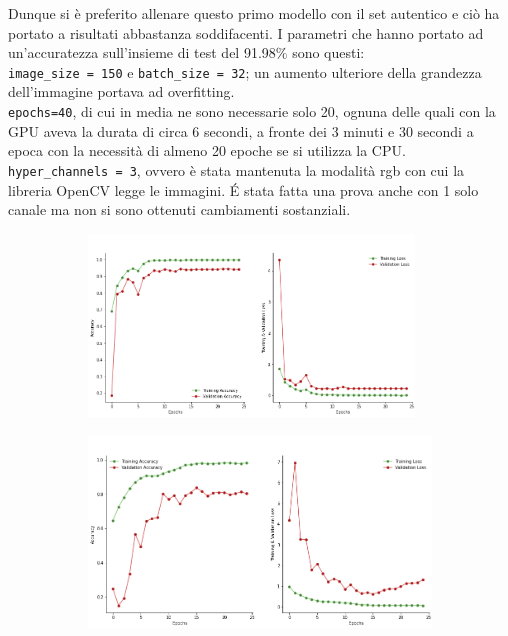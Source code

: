 \begin{enumerate}
       Dunque si è preferito allenare questo primo modello con il set autentico e 
       ciò ha portato a risultati abbastanza soddifacenti. 
       I parametri che hanno portato ad un'accuratezza sull'insieme di test del 91.98$\%$ sono questi:\\
       \lstinline{image_size = 150} e \lstinline{batch_size = 32}; un aumento ulteriore
        della grandezza dell'immagine portava ad overfitting. \\
       \lstinline{epochs=40}, di cui in media ne sono necessarie solo 20, ognuna delle quali con la GPU aveva la durata di circa 6 secondi, 
       a fronte dei 3 minuti e 30 secondi a epoca con la necessità di almeno 20 epoche se si utilizza la CPU.\\
       \lstinline{hyper_channels = 3}, ovvero è stata mantenuta la modalità rgb con cui la libreria OpenCV legge le immagini.
       É stata fatta una prova anche con 1 solo canale ma non si sono ottenuti cambiamenti sostanziali. 
       \begin{figure}[H]
        \begin{subfigure}{0.5\textwidth}
          \centering
          \includegraphics[width=0.95\textwidth]{Figures/history-first-model-original}
          \caption{}
          \label{fig:snap1}
        \end{subfigure}%
        \begin{subfigure}{0.5\textwidth}
          \centering
          \includegraphics[width=.95\textwidth]{Figures/history-first-model-aug}

\end{subfigure}
\end{figure}
\end{enumerate}
